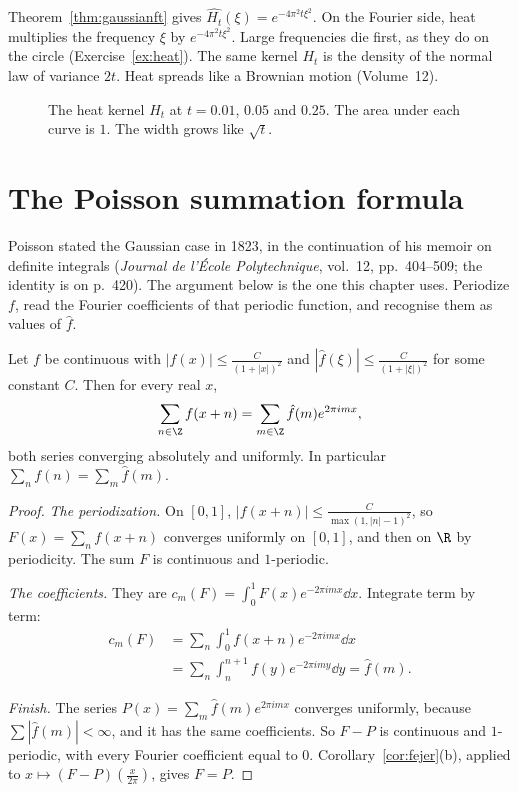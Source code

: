 Theorem~\ref{thm:gaussianft} gives $\widehat{H_t}(\xi)=e^{-4\pi^2t\xi^2}$. On the Fourier side, heat multiplies the frequency $\xi$ by $e^{-4\pi^2t\xi^2}$. Large frequencies die first, as they do on the circle (Exercise~\ref{ex:heat}). The same kernel $H_t$ is the density of the normal law of variance $2t$. Heat spreads like a Brownian motion (Volume~12).

\begin{figure}[ht]
\centering
{}
\caption{The heat kernel $H_t$ at $t=0.01$, $0.05$ and $0.25$. The area under each curve is $1$. The width grows like $\sqrt t$.}
\label{fig:heat}
\end{figure}

\section{The Poisson summation formula}


Poisson stated the Gaussian case in 1823, in the continuation of his memoir on definite integrals (\emph{Journal de l'\'Ecole Polytechnique}, vol.~12, pp.~404--509; the identity is on p.~420). The argument below is the one this chapter uses. Periodize $f$, read the Fourier coefficients of that periodic function, and recognise them as values of $\hat f$.

\begin{theorem}\label{thm:poisson}
Let $f$ be continuous with $|f(x)|\le\frac C{(1+|x|)^2}$ and $|\hat f(\xi)|\le\frac C{(1+|\xi|)^2}$ for some constant $C$. Then for every real $x$,
\[
\sum_{n\in\Z}f(x+n)=\sum_{m\in\Z}\hat f(m)e^{2\pi imx},
\]
both series converging absolutely and uniformly. In particular $\sum_nf(n)=\sum_m\hat f(m)$.
\end{theorem}
\begin{proof}
\emph{The periodization.} On $[0,1]$, $|f(x+n)|\le\frac C{\max(1,|n|-1)^2}$, so $F(x)=\sum_nf(x+n)$ converges uniformly on $[0,1]$, and then on $\R$ by periodicity. The sum $F$ is continuous and $1$-periodic.

\emph{The coefficients.} They are $c_m(F)=\int_0^1F(x)e^{-2\pi imx}\dd x$. Integrate term by term:
\[
\begin{aligned}c_m(F)&=\sum_n\int_0^1f(x+n)e^{-2\pi imx}\dd x\\&=\sum_n\int_n^{n+1}f(y)e^{-2\pi imy}\dd y=\hat f(m).\end{aligned}
\]

\emph{Finish.} The series $P(x)=\sum_m\hat f(m)e^{2\pi imx}$ converges uniformly, because $\sum|\hat f(m)|<\infty$, and it has the same coefficients. So $F-P$ is continuous and $1$-periodic, with every Fourier coefficient equal to $0$. Corollary~\ref{cor:fejer}(b), applied to $x\mapsto(F-P)(\frac x{2\pi})$, gives $F=P$.
\end{proof}

